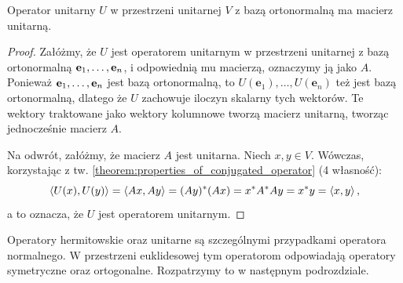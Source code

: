 \begin{theorem}
    Operator unitarny $U$ w przestrzeni unitarnej $V$ z bazą ortonormalną ma macierz unitarną.
\end{theorem}
\begin{proof}
    Załóżmy, że $U$ jest operatorem unitarnym w przestrzeni unitarnej z bazą ortonormalną $\mathbf{e}_1, \ldots, \mathbf{e}_n$, i odpowiednią mu macierzą, oznaczymy ją jako $A$.
    Ponieważ $\mathbf{e}_1, \ldots, \mathbf{e}_n$ jest bazą ortonormalną, to $U(\mathbf{e}_1), \ldots, U(\mathbf{e}_n)$ też jest bazą ortonormalną, dlatego że $U$ zachowuje iloczyn skalarny tych wektorów. Te wektory traktowane jako wektory kolumnowe tworzą macierz unitarną, tworząc jednocześnie macierz $A$.

    Na odwrót, załóżmy, że macierz $A$ jest unitarna. Niech $x, y \in V$. Wówczas, korzystając z tw. \ref{theorem:properties_of_conjugated_operator} (4 własność):
    $$\left\langle U(x), U(y) \right\rangle = \left\langle Ax, Ay \right\rangle = (Ay)^*(Ax) = x^*A^*Ay = x^*y = \left\langle x, y \right\rangle,$$
    a to oznacza, że $U$ jest operatorem unitarnym.
\end{proof}

Operatory hermitowskie oraz unitarne są szczególnymi przypadkami operatora normalnego.
W przestrzeni euklidesowej tym operatorom odpowiadają operatory symetryczne oraz ortogonalne. Rozpatrzymy to w następnym podrozdziale.
